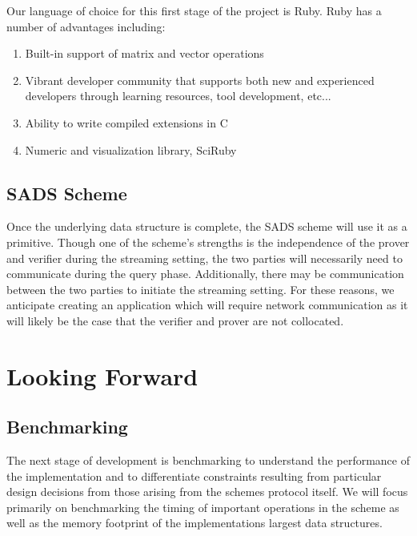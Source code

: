\documentclass[11pt, letterpaper, oneside]{article}
\begin{document}
	Our language of choice for this first stage of the project is Ruby. Ruby has a number of advantages including:

	\begin{enumerate}
	\item Built-in support of matrix and vector operations
	\item Vibrant developer community that supports both new and experienced developers through learning resources, tool development, etc...
	\item Ability to write compiled extensions in C
	\item Numeric and visualization library, SciRuby
	\end{enumerate}

	\subsection{SADS Scheme}

	Once the underlying data structure is complete, the SADS scheme will use it as a primitive.
	Though one of the scheme's strengths is the independence of the prover and verifier during the streaming setting, the two parties will necessarily need to communicate during the query phase.
	Additionally, there may be communication between the two parties to initiate the streaming setting.
	For these reasons, we anticipate creating an application which will require network communication as it will likely be the case that the verifier and prover are not collocated.



\section{Looking Forward}

	\subsection{ Benchmarking }
	
	The next stage of development is benchmarking to understand the performance of the implementation and to differentiate constraints resulting from particular design decisions from those arising from the schemes protocol itself.
	We will focus primarily on benchmarking the timing of important operations in the scheme as well as the memory footprint of the implementations largest data structures.
	
\end{document}
